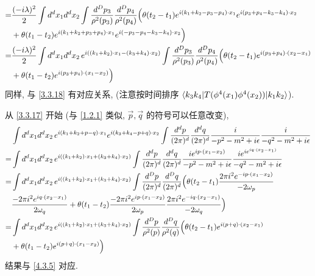 \begin{itemize}
\begin{align}
		=& \frac{(- i \lambda)^2}{2} \int d^d x_1 d^d x_2 \int \frac{d^D p_3}{\rho^2(p_3)} \frac{d^D p_4}{\rho^2(p_4)} \Big( \theta(t_2 - t_1) e^{i (k_1 + k_2 - p_3 - p_4) \cdot x_1} e^{i (p_3 + p_4 - k_3 - k_4) \cdot x_2} \notag \\
		& + \theta(t_1 - t_2) e^{i (k_1 + k_2 + p_3 + p_4) \cdot x_1} e^{i (- p_3 - p_4 - k_3 - k_4) \cdot x_2} \Big) \notag \\
		=& \frac{(- i \lambda)^2}{2} \int d^d x_1 d^d x_2 \, e^{i ((k_1 + k_2) \cdot x_1 - (k_3 + k_4) \cdot x_2)} \int \frac{d^D p_3}{\rho^2(p_3)} \frac{d^D p_4}{\rho^2(p_4)} \Big( \theta(t_2 - t_1) e^{i (p_3 + p_4) \cdot (x_2 - x_1)} \notag \\
		& + \theta(t_1 - t_2) e^{i (p_3 + p_4) \cdot (x_1 - x_2)} \Big) \label{4.3.5}
	\end{align}
	同样, 与 \eqref{3.3.18} 有对应关系, (注意按时间排序 $\braket{k_3 k_4 | T(\phi^4(x_1) \phi^4(x_2)) | k_1 k_2}$).
	
	\begin{tcolorbox}[title=calculation:]
		从 \eqref{3.3.17} 开始 (与 \eqref{1.2.1} 类似, $\vec{p}, \vec{q}$ 的符号可以任意改变),
		\begin{align}
			& \int d^d x_1 d^d x_2 \, e^{i (k_1 + k_2 + p - q) \cdot x_1} e^{i (k_3 + k_4 - p + q) \cdot x_2} \int \frac{d^d p}{(2 \pi)^d} \frac{d^d q}{(2 \pi)^d} \frac{i}{- p^2 - m^2 + i \epsilon} \frac{i}{- q^2 - m^2 + i \epsilon} \notag \\
			=& \int d^d x_1 d^d x_2 \, e^{i ((k_1 + k_2) \cdot x_1 + (k_3 + k_4) \cdot x_2)} \int \frac{d^d p}{(2 \pi)^d} \frac{d^d q}{(2 \pi)^d} \frac{i e^{i p \cdot (x_1 - x_2)}}{- p^2 - m^2 + i \epsilon} \frac{i e^{i e^{i q \cdot (x_2 - x_1)}}}{- q^2 - m^2 + i \epsilon} \notag \\
			=& \int d^d x_1 d^d x_2 \, e^{i ((k_1 + k_2) \cdot x_1 + (k_3 + k_4) \cdot x_2)} \int \frac{d^D p}{(2 \pi)^d} \frac{d^D q}{(2 \pi)^d} \Big( \theta(t_2 - t_1) \frac{2 \pi i^2 e^{- i p \cdot (x_1 - x_2)}}{- 2 \omega_p} \notag \\
			& \frac{- 2 \pi i^2 e^{i q \cdot (x_2 - x_1)}}{2 \omega_q} + \theta(t_1 - t_2) \frac{- 2 \pi i^2 e^{i p \cdot (x_1 - x_2)}}{2 \omega_p} \frac{2 \pi i^2 e^{- i q \cdot (x_2 - x_1)}}{- 2 \omega_q} \Big) \notag \\
			=& \int d^d x_1 d^d x_2 \, e^{i ((k_1 + k_2) \cdot x_1 + (k_3 + k_4) \cdot x_2)} \int \frac{d^D p}{\rho^2(p)} \frac{d^D q}{\rho^2(q)} \Big( \theta(t_2 - t_1) e^{i (p + q) \cdot (x_2 - x_1)} \notag \\
			& + \theta(t_1 - t_2) e^{i (p + q) \cdot (x_1 - x_2)} \Big)
		\end{align}
		结果与 \eqref{4.3.5} 对应.
	\end{tcolorbox}
\end{itemize}

